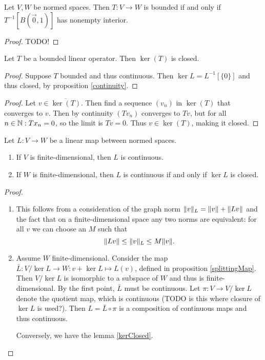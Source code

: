 \begin{proposition}
Let $V,W$ be normed spaces. Then $T:V\to W$ is bounded \textup{if and only if}
$T^{-1}[B(\vec{0},1)]$ has nonempty interior.
\end{proposition}
\begin{proof}
TODO!
\end{proof}

\begin{lemma} \label{kerClosed}
Let $T$ be a bounded linear operator. Then $\ker(T)$ is closed.
\end{lemma}
\begin{proof}
Suppose $T$ bounded and thus continuous. Then $\ker L = L^{-1}[\{0\}]$ and thus closed, by proposition \ref{continuity}.
\end{proof}
\begin{proof}
Let $v\in \overline{\ker(T)}$. Then find a sequence $(v_n)$ in $\ker(T)$ that converges to $v$. Then by continuity $(Tv_n)$ converges to $Tv$, but for all $n\in\mathbb{N}: Tx_n = 0$, so the limit is $Tv=0$. Thus $v\in\ker(T)$, making it closed.
\end{proof}

\begin{proposition}\label{continuousMapCriterion}
Let $L:V\to W$ be a linear map between normed spaces.
\begin{enumerate}
\item If $V$ is finite-dimensional, then $L$ is continuous.
\item If $W$ is finite-dimensional, then $L$ is continuous \textup{if and only if} $\ker L$ is closed.
\end{enumerate}
\end{proposition}
\begin{proof}
\begin{enumerate}
\item This follows from a consideration of the graph norm $\lVert v\rVert_L = \lVert v\rVert+\lVert Lv\rVert$ and the fact that on a finite-dimensional space any two norms are equivalent: for all $v$ we can choose an $M$ such that
\[ \lVert Lv\rVert\leq \lVert v\rVert_L \leq M\lVert v\rVert. \]
\item Assume $W$ finite-dimensional. Consider the map $\bar{L}:V/\ker L\to W: v+\ker{L}\mapsto L(v)$, defined in proposition \ref{splittingMap}. Then $V/\ker L$ is isomorphic to a subspace of $W$ and thus is finite-dimensional. By the first point, $\bar{L}$ must be continuous. Let $\pi: V\to V/\ker L$ denote the quotient map, which is continuous (TODO is this where closure of $\ker L$ is used?). Then $L = \bar{L}\circ \pi$ is a composition of continuous maps and thus continuous.

Conversely, we have the lemma \ref{kerClosed}.
\end{enumerate}
\end{proof}


